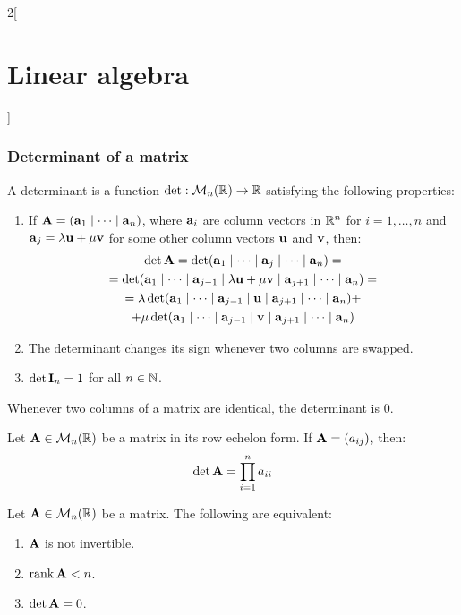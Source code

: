 \documentclass[../../../main.tex]{subfiles}
\begin{document}
\begin{multicols}{2}[\section{Linear algebra}]
  \subsubsection{Determinant of a matrix}
  \begin{definition}[Determinant]
    A determinant is a function $\det:\mathcal{M}_n(\mathbb{R})\rightarrow\mathbb{R}$ satisfying the following properties:
    \begin{enumerate}
      \item If $\boldsymbol{\mathrm{A}}=(\boldsymbol{\mathrm{a}}_1\mid\cdots\mid \boldsymbol{\mathrm{a}}_n)$, where $\boldsymbol{\mathrm{a}}_i$ are column vectors in $\mathbb{R}^n$ for $i=1,\ldots,n$ and $\boldsymbol{\mathrm{a}}_j=\lambda\boldsymbol{\mathrm{u}}+\mu\boldsymbol{\mathrm{v}}$ for some other column vectors $\boldsymbol{\mathrm{u}}$ and $\boldsymbol{\mathrm{v}}$, then:
            \begin{multline*}
              \det \boldsymbol{\mathrm{A}}=\det(\boldsymbol{\mathrm{a}}_1\mid\cdots\mid\boldsymbol{\mathrm{a}}_j\mid\cdots\mid \boldsymbol{\mathrm{a}}_n)=\\=\det(\boldsymbol{\mathrm{a}}_1\mid\cdots\mid \boldsymbol{\mathrm{a}}_{j-1}\mid\lambda \boldsymbol{\mathrm{u}}+\mu \boldsymbol{\mathrm{v}}\mid \boldsymbol{\mathrm{a}}_{j+1}\mid\cdots\mid \boldsymbol{\mathrm{a}}_n)=\\=\lambda\det(\boldsymbol{\mathrm{a}}_1\mid\cdots\mid \boldsymbol{\mathrm{a}}_{j-1}\mid \boldsymbol{\mathrm{u}}\mid \boldsymbol{\mathrm{a}}_{j+1}\mid\cdots\mid \boldsymbol{\mathrm{a}}_n)+\\+\mu\det(\boldsymbol{\mathrm{a}}_1\mid\cdots\mid \boldsymbol{\mathrm{a}}_{j-1}\mid \boldsymbol{\mathrm{v}}\mid \boldsymbol{\mathrm{a}}_{j+1}\mid\cdots\mid \boldsymbol{\mathrm{a}}_n)
            \end{multline*}
      \item The determinant changes its sign whenever two columns are swapped.
      \item $\det \boldsymbol{\mathrm{I}}_n=1$ for all $n\in\mathbb{N}$.
    \end{enumerate}
  \end{definition}
  \begin{lemma}
    Whenever two columns of a matrix are identical, the determinant is 0.
  \end{lemma}
  \begin{proposition}
    Let $\boldsymbol{\mathrm{A}}\in\mathcal{M}_n(\mathbb{R})$ be a matrix in its row echelon form. If $\boldsymbol{\mathrm{A}}=(a_{ij})$, then: $$\det\boldsymbol{\mathrm{A}}=\prod_{i=1}^na_{ii}$$
  \end{proposition}
  \begin{proposition}
    Let $\boldsymbol{\mathrm{A}}\in\mathcal{M}_n(\mathbb{R})$ be a matrix. The following are equivalent:
    \begin{enumerate}
      \item $\boldsymbol{\mathrm{A}}$ is not invertible.
      \item $\rank\boldsymbol{\mathrm{A}}<n$.
      \item $\det\boldsymbol{\mathrm{A}}=0$.
    \end{enumerate}

\end{proposition}
\end{multicols}
\end{document}
